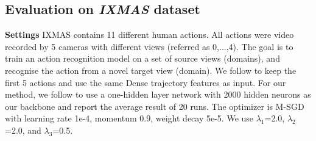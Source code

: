 \documentclass[10pt,twocolumn,letterpaper]{article}
\newcommand{\keypoint}[1]{\vspace{0.1cm}\noindent\textbf{#1}\quad}
\begin{document}
\begin{table*}[t]
\centering
{}
\vspace{-0.3cm}
\caption{\small Cross-dataset object recognition results (accuracy. \%) on VLCS benchmark. Best in bold.}
\label{tab:vlcs}
    \vspace{-0.3cm}
\end{table*}


\subsection{Evaluation on \textbf{\textit{IXMAS}} dataset}
\keypoint{Settings} IXMAS contains 11 different human actions. All actions were video recorded by 5 cameras with different views (referred as 0,...,4). The goal is to train an action recognition model on a set of source views (domains), and recognise the action from a novel target view (domain).
We follow \cite{Li2018mmdaae} to keep the first 5 actions and use the same Dense trajectory features as  input. For our method, we follow \cite{Li2018mmdaae} to use a one-hidden layer network with 2000 hidden neurons as our backbone and report the average result of 20 runs. The optimizer is M-SGD with learning rate 1e-4, momentum 0.9, weight decay 5e-5. We use $\lambda_1$=2.0, $\lambda_2$=2.0, and $\lambda_3$=0.5.
\end{document}
